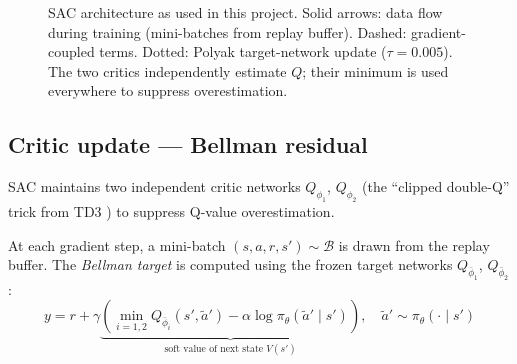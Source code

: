 \documentclass[11pt]{article}
\begin{document}
\begin{figure}[H]
\caption{SAC architecture as used in this project.
  Solid arrows: data flow during training (mini-batches from replay buffer).
  Dashed: gradient-coupled terms.
  Dotted: Polyak target-network update ($\tau = 0.005$).
  The two critics independently estimate $Q$; their minimum is used everywhere
  to suppress overestimation.}
\label{fig:sac_arch}
\end{figure}

\subsection*{Critic update --- Bellman residual}

SAC maintains two independent critic networks $Q_{\phi_1}$, $Q_{\phi_2}$
(the ``clipped double-Q'' trick from TD3 \cite{fujimoto2018td3}) to suppress
Q-value overestimation.

At each gradient step, a mini-batch
$(s, a, r, s') \sim \mathcal{B}$ is drawn from the replay buffer.
The \emph{Bellman target} is computed using the frozen target networks
$Q_{\bar\phi_1}$, $Q_{\bar\phi_2}$:
\begin{equation}
  y
  = r + \gamma
    \underbrace{
      \left(
        \min_{i=1,2} Q_{\bar\phi_i}(s', \tilde{a}')
        - \alpha \log \pi_\theta(\tilde{a}' \mid s')
      \right)
    }_{\text{soft value of next state } V(s')}
  , \quad
  \tilde{a}' \sim \pi_\theta(\cdot \mid s')
  \label{eq:bellman_target}
\end{equation}
\end{document}
